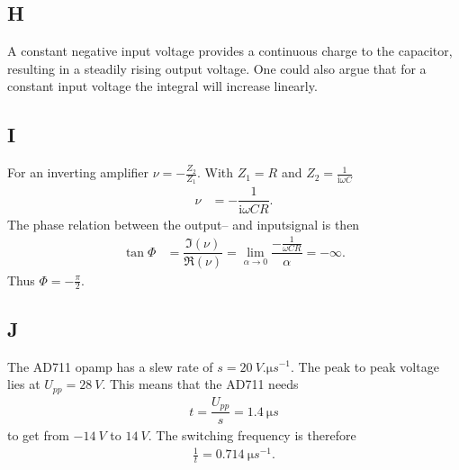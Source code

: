 \documentclass[a4paper,10pt]{article}
\numberwithin{equation}{section}
\begin{document}
\begin{multicols}{2}
        \subsection{H}
        A constant negative input voltage provides a continuous charge to the capacitor, resulting in a steadily rising output voltage.
        One could also argue that for a constant input voltage the integral will increase linearly.

        \subsection{I}
        For an inverting amplifier $\nu =-\tfrac{Z_2}{Z_1}$.
        With $Z_1=R$ and $Z_2=\tfrac{1}{\text{i}\omega C}$ 
        \begin{align} 
                &&&& \nu  &= -\dfrac{1}{\text{i}\omega CR}. &&&& 
        \end{align} 
        The phase relation between the output-- and inputsignal is then
        \begin{align} 
                \tan \Phi  &= \dfrac{\mathfrak{I}\left(\nu \right)}{\mathfrak{R}\left(\nu \right)}=\lim_{\alpha \rightarrow 0}\dfrac{-\tfrac{1}{\omega CR}}{\alpha }=-\infty
        .\end{align} 
        Thus $\Phi =-\tfrac{\pi }{2}$.

        \subsection{J}
        The AD711 opamp has a slew rate of $s=\SI{20}{V.\micro s ^{-1}}$.
        The peak to peak voltage lies at $U_{p p}=\SI{28}{V}$.
        This means that the AD711 needs
        \begin{align} 
                t=\dfrac{U_{p p}}{s}=\SI{1.4}{\micro s}
        \end{align} 
        to get from $\SI{-14}{V}$ to $\SI{+14}{V}$.
        The switching frequency is therefore
        \begin{align} 
                \tfrac{1}{t}=\SI{0.714}{\micro s ^{-1}}
        .\end{align} 
        

\end{multicols}
\end{document}
